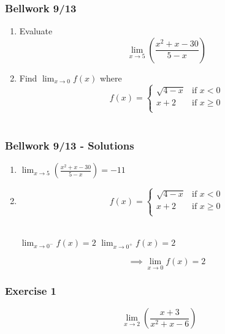 \documentclass[12pt]{beamer}
\begin{document}
\begin{frame}
	\frametitle{Bellwork 9/13}
	\vspace*{\fill}
	\vspace*{\fill}
	\initclock
	\begin{enumerate}
		\item Evaluate \[\displaystyle\lim_{x\to5}\left(\frac{x^2+x-30}{5-x}\right)\]
		\item Find $\displaystyle\lim_{x\to0}f(x)$ where
		      \[
			      f(x) =
			      \begin{cases}
				      \sqrt{4-x} & \text{if } x < 0    \\
				      x+2        & \text{if } x \geq 0 \\
			      \end{cases}
		      \]\\
	\end{enumerate}
	\vspace*{\fill}
	\vspace*{\fill}
	\crono
\end{frame}
\begin{frame}
	\frametitle{Bellwork 9/13 - Solutions}
	\begin{enumerate}\itemsep2ex
		\item $\displaystyle\lim_{x\to5}\left(\frac{x^2+x-30}{5-x}\right)=\boxed{-11}$
		\item
		      \[
			      f(x) =
			      \begin{cases}
				      \sqrt{4-x} & \text{if } x < 0    \\
				      x+2        & \text{if } x \geq 0 \\
			      \end{cases}
		      \]\\
		      \begin{table}[]
			      $\displaystyle\lim_{x\to0^{-}}f(x)=2$
			      \hspace{0.25cm}
			      $\displaystyle\lim_{x\to0^{+}}f(x)=2$
		      \end{table}
		      \vspace*{\fill}
		      \[\implies\displaystyle\lim_{x\to0}f(x) = \boxed{2}\]
	\end{enumerate}
\end{frame}
\begin{frame}
	\frametitle{Exercise 1}
	\vspace*{\fill}
	\vspace*{\fill}
	\vspace*{\fill}
	\initclock
	\Large
	\[\displaystyle\lim_{x\to2}\left(\frac{x+3}{x^2+x-6}\right)\]\\
	\vspace*{\fill}
	\vspace*{\fill}
	\vspace*{\fill}
	\vspace*{\fill}
	\crono
\end{frame}
\end{document}
